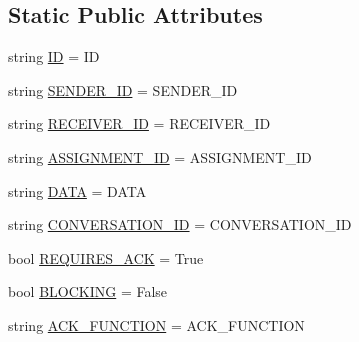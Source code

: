 \subsection*{Static Public Attributes}
\begin{DoxyCompactItemize}
\item 
string \hyperlink{classparlai_1_1mturk_1_1core_1_1legacy__2018_1_1test_1_1test__socket__manager_1_1TestPacket_abf9fc9bcbfeda14b60db9f1fafea20e2}{ID} = \textquotesingle{}ID\textquotesingle{}
\item 
string \hyperlink{classparlai_1_1mturk_1_1core_1_1legacy__2018_1_1test_1_1test__socket__manager_1_1TestPacket_ac9ccb8bcf2537e1215324478baa713fe}{S\+E\+N\+D\+E\+R\+\_\+\+ID} = \textquotesingle{}S\+E\+N\+D\+E\+R\+\_\+\+ID\textquotesingle{}
\item 
string \hyperlink{classparlai_1_1mturk_1_1core_1_1legacy__2018_1_1test_1_1test__socket__manager_1_1TestPacket_a0edfb5a546d571f50d4a0b330b2c36d8}{R\+E\+C\+E\+I\+V\+E\+R\+\_\+\+ID} = \textquotesingle{}R\+E\+C\+E\+I\+V\+E\+R\+\_\+\+ID\textquotesingle{}
\item 
string \hyperlink{classparlai_1_1mturk_1_1core_1_1legacy__2018_1_1test_1_1test__socket__manager_1_1TestPacket_afb992cc9a74df5f87f53f2ea15d1b32c}{A\+S\+S\+I\+G\+N\+M\+E\+N\+T\+\_\+\+ID} = \textquotesingle{}A\+S\+S\+I\+G\+N\+M\+E\+N\+T\+\_\+\+ID\textquotesingle{}
\item 
string \hyperlink{classparlai_1_1mturk_1_1core_1_1legacy__2018_1_1test_1_1test__socket__manager_1_1TestPacket_aa071fd1333b14550bc192ee2801e6599}{D\+A\+TA} = \textquotesingle{}D\+A\+TA\textquotesingle{}
\item 
string \hyperlink{classparlai_1_1mturk_1_1core_1_1legacy__2018_1_1test_1_1test__socket__manager_1_1TestPacket_ab7499aedc2298b6b733029bb6888adc9}{C\+O\+N\+V\+E\+R\+S\+A\+T\+I\+O\+N\+\_\+\+ID} = \textquotesingle{}C\+O\+N\+V\+E\+R\+S\+A\+T\+I\+O\+N\+\_\+\+ID\textquotesingle{}
\item 
bool \hyperlink{classparlai_1_1mturk_1_1core_1_1legacy__2018_1_1test_1_1test__socket__manager_1_1TestPacket_aaa2fa8339b819f56227433067419edf8}{R\+E\+Q\+U\+I\+R\+E\+S\+\_\+\+A\+CK} = True
\item 
bool \hyperlink{classparlai_1_1mturk_1_1core_1_1legacy__2018_1_1test_1_1test__socket__manager_1_1TestPacket_afcd4bc504fa16238d6acb6e63436e74d}{B\+L\+O\+C\+K\+I\+NG} = False
\item 
string \hyperlink{classparlai_1_1mturk_1_1core_1_1legacy__2018_1_1test_1_1test__socket__manager_1_1TestPacket_af80f9930817932edf171298595ef4c5d}{A\+C\+K\+\_\+\+F\+U\+N\+C\+T\+I\+ON} = \textquotesingle{}A\+C\+K\+\_\+\+F\+U\+N\+C\+T\+I\+ON\textquotesingle{}
\end{DoxyCompactItemize}


